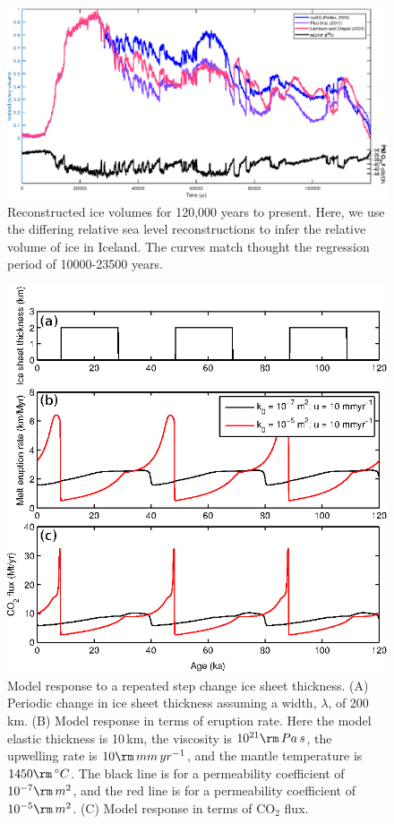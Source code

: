 \documentclass[draft,grl]{agutexSI2018}
\begin{document}
\begin{figure}
\includegraphics{../figures/version05/supp-figure-2.eps}
\caption{Reconstructed ice volumes for 120,000 years to present. Here, we use the differing relative sea level reconstructions \citep{peltier-2004,pico-etal-2017,lambeck-2001} to infer the relative volume of ice in Iceland. The curves match thought the regression period of 10000-23500 years.}
\label{fg:S2}
\end{figure}

\begin{figure}
\includegraphics{../figures/version05/supp-figure-3.eps}
\caption{Model response to a repeated step change ice sheet thickness. (A) Periodic change in ice sheet thickness assuming a width, $\lambda$, of 200\,km. (B) Model response in terms of eruption rate. Here the model elastic thickness is 10\,km, the viscosity is $10^{21}\rm\,Pa\,s$, the upwelling rate is $10\rm\,mm\,yr^{-1}$, and the mantle temperature is $1450\rm\,^{\circ}C$. The black line is for a permeability coefficient of $10^{-7}\rm\,m^{2}$, and the red line is for a permeability coefficient of $10^{-5}\rm\,m^{2}$. (C) Model response in terms of CO$_{2}$ flux.}
\label{fg:S3}
\end{figure}
\end{document}
